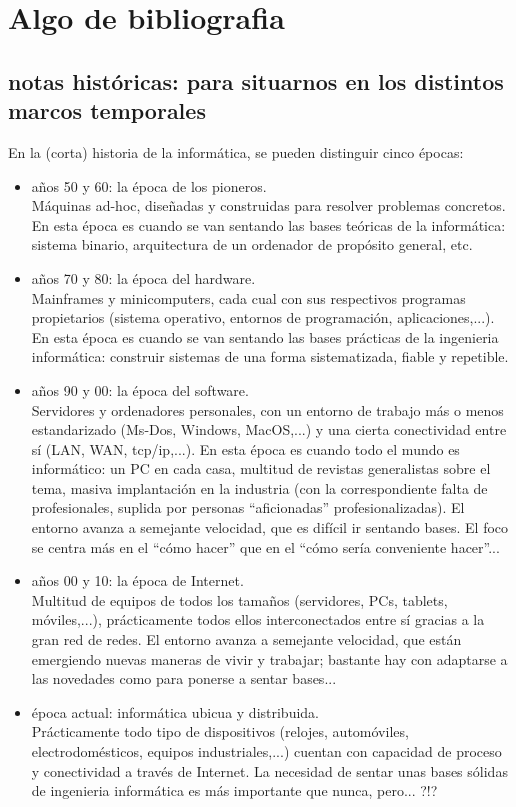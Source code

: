 \documentclass[spanish,12pt,a4paper,final,oneside]{book}
\begin{document}
\chapter{Algo de bibliografia}

\section{notas históricas: para situarnos en los distintos marcos temporales}
En la (corta) historia de la informática, se pueden distinguir cinco épocas:
\begin{itemize}
\item años 50 y 60: la época de los pioneros. 
\\Máquinas ad-hoc, diseñadas y construidas para resolver problemas concretos. En esta época es cuando se van sentando las bases teóricas de la informática: sistema binario, arquitectura de un ordenador de propósito general, etc.
\item años 70 y 80: la época del hardware. 
\\Mainframes y minicomputers, cada cual con sus respectivos programas propietarios (sistema operativo, entornos de programación, aplicaciones,...). En esta época es cuando se van sentando las bases prácticas de la ingenieria informática: construir sistemas de una forma sistematizada, fiable y repetible.
\item años 90 y 00: la época del software. 
\\Servidores y ordenadores personales, con un entorno de trabajo más o menos estandarizado (Ms-Dos, Windows, MacOS,...) y una cierta conectividad entre sí (LAN, WAN, tcp/ip,...). En esta época es cuando todo el mundo es informático: un PC en cada casa, multitud de revistas generalistas sobre el tema, masiva implantación en la industria (con la correspondiente falta de profesionales, suplida por personas ``aficionadas'' profesionalizadas). El entorno avanza a semejante velocidad, que es difícil ir sentando bases. El foco se centra más en el ``cómo hacer'' que en el ``cómo sería conveniente hacer''...
\item años 00 y 10: la época de Internet. 
\\Multitud de equipos de todos los tamaños (servidores, PCs, tablets, móviles,...), prácticamente todos ellos interconectados entre sí gracias a la gran red de redes. El entorno avanza a semejante velocidad, que están emergiendo nuevas maneras de vivir y trabajar; bastante hay con adaptarse a las novedades como para ponerse a sentar bases...
\item época actual: informática ubicua y distribuida. 
\\Prácticamente todo tipo de dispositivos (relojes, automóviles, electrodomésticos, equipos industriales,...) cuentan con capacidad de proceso y conectividad a través de Internet. La necesidad de sentar unas bases sólidas de ingenieria informática es más importante que nunca, pero... ?!?
\end{itemize}
\end{document}

